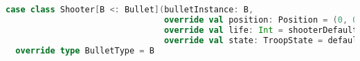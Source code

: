 \begin{lstlisting}[language=Scala, label=code:plant-shooter caption=Type class Shooter.]
case class Shooter[B <: Bullet](bulletInstance: B,
                                override val position: Position = (0, 0),
                                override val life: Int = shooterDefaultLife,
                                override val state: TroopState = defaultPlantState) extends Plant :
  override type BulletType = B
\end{lstlisting}